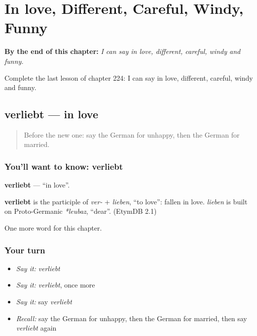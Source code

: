 
\chapter{In love, Different, Careful, Windy, Funny}
\label{ch:ge-in-love-different-careful-windy-funny}

\begin{chapteropening}
\textbf{By the end of this chapter:} \emph{I can say in love, different, careful, windy and funny.}

Complete the last lesson of chapter 224: I can say in love, different, careful, windy and funny.
\end{chapteropening}

\section[verliebt]{verliebt — in love}

\label{lesson:GE-C224-verliebt}



\begin{quote}
Before the new one: say the German for unhappy, then the German for married.
\end{quote}

\subsection*{You'll want to know: verliebt}
\textbf{verliebt} — \textquotedblleft{}in love\textquotedblright{}.

\begin{cousinweb}
\textbf{verliebt} is the participle of \emph{ver-} + \emph{lieben}, \textquotedblleft{}to love\textquotedblright{}: fallen in love. \emph{lieben} is built on Proto-Germanic \emph{*leubaz}, \textquotedblleft{}dear\textquotedblright{}. (EtymDB 2.1)
\end{cousinweb}

\begin{grammarlens}[title={What you've built}]
One more word for this chapter.
\end{grammarlens}

\subsection*{Your turn}
\begin{itemize}
\raggedright
  \item \emph{Say it:} \emph{verliebt}
  \item \emph{Say it:} \emph{verliebt}, once more
  \item \emph{Say it:} say \emph{verliebt}
  \item \emph{Recall:} say the German for unhappy, then the German for married, then say \emph{verliebt} again
\end{itemize}

